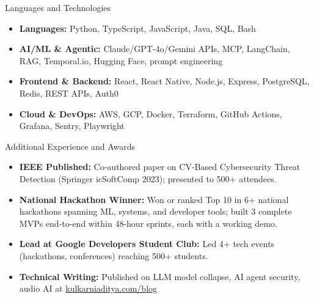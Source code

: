 \documentclass[]{mcdowellcv}
\begin{document}
\begin{cvsection}{Languages and Technologies}
  \begin{cvsubsection}{}{}{}
    \begin{itemize}
      \item \textbf{Languages:} Python, TypeScript, JavaScript, Java, SQL, Bash
      \item \textbf{AI/ML \& Agentic:} Claude/GPT-4o/Gemini APIs, MCP, LangChain, RAG, Temporal.io, Hugging Face, prompt engineering
      \item \textbf{Frontend \& Backend:} React, React Native, Node.js, Express, PostgreSQL, Redis, REST APIs, Auth0
      \item \textbf{Cloud \& DevOps:} AWS, GCP, Docker, Terraform, GitHub Actions, Grafana, Sentry, Playwright
    \end{itemize}
  \end{cvsubsection}
\end{cvsection}

\begin{cvsection}{Additional Experience and Awards}
  \begin{cvsubsection}{}{}{}
    \begin{itemize}
      \item \textbf{IEEE Published:} Co-authored paper on CV-Based Cybersecurity Threat Detection (Springer icSoftComp 2023); presented to 500+ attendees.
      \item \textbf{National Hackathon Winner:} Won or ranked Top 10 in 6+ national hackathons spanning ML, systems, and developer tools; built 3 complete MVPs end-to-end within 48-hour sprints, each with a working demo.
      \item \textbf{Lead at Google Developers Student Club:} Led 4+ tech events (hackathons, conferences) reaching 500+ students.
      \item \textbf{Technical Writing:} Published on LLM model collapse, AI agent security, audio AI at \href{https://www.kulkarniaditya.com/blog}{kulkarniaditya.com/blog}
    \end{itemize}
  \end{cvsubsection}
\end{cvsection}
\end{document}

